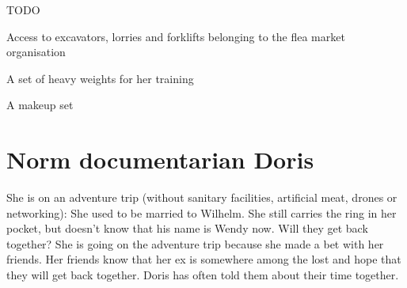\begin{npcBox}[title=Wendy]
    \begin{consequences}
    \item {}
    \item {}
    \item {}
    \end{consequences}

    \begin{npcDescription}
    TODO
    \end{npcDescription}


    \begin{equipment}
    \item Access to excavators, lorries and forklifts belonging to the flea market organisation
    \item A set of heavy weights for her training
    \item A makeup set
    \end{equipment}
\end{npcBox}
\newpage

\section{Norm documentarian Doris}

She is on an adventure trip (without sanitary facilities, artificial meat, drones or networking): She used to be married to Wilhelm. She still carries the ring in her pocket, but doesn't know that his name is Wendy now. Will they get back together?
She is going on the adventure trip because she made a bet with her friends. Her friends know that her ex is somewhere among the lost and hope that they will get back together. Doris has often told them about their time together.


